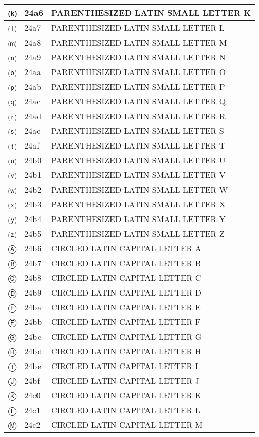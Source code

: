 \documentclass[12pt,letterpaper,openany]{book}
\begin{document}
\begin{center}
\begin{supertabular}{|m{0.25in}|m{0.5in}|m{4in}|}
⒦ & 24a6 & PARENTHESIZED LATIN SMALL LETTER K\\\hline
⒧ & 24a7 & PARENTHESIZED LATIN SMALL LETTER L\\\hline
⒨ & 24a8 & PARENTHESIZED LATIN SMALL LETTER M\\\hline
⒩ & 24a9 & PARENTHESIZED LATIN SMALL LETTER N\\\hline
⒪ & 24aa & PARENTHESIZED LATIN SMALL LETTER O\\\hline
⒫ & 24ab & PARENTHESIZED LATIN SMALL LETTER P\\\hline
⒬ & 24ac & PARENTHESIZED LATIN SMALL LETTER Q\\\hline
⒭ & 24ad & PARENTHESIZED LATIN SMALL LETTER R\\\hline
⒮ & 24ae & PARENTHESIZED LATIN SMALL LETTER S\\\hline
⒯ & 24af & PARENTHESIZED LATIN SMALL LETTER T\\\hline
⒰ & 24b0 & PARENTHESIZED LATIN SMALL LETTER U\\\hline
⒱ & 24b1 & PARENTHESIZED LATIN SMALL LETTER V\\\hline
⒲ & 24b2 & PARENTHESIZED LATIN SMALL LETTER W\\\hline
⒳ & 24b3 & PARENTHESIZED LATIN SMALL LETTER X\\\hline
⒴ & 24b4 & PARENTHESIZED LATIN SMALL LETTER Y\\\hline
⒵ & 24b5 & PARENTHESIZED LATIN SMALL LETTER Z\\\hline
Ⓐ & 24b6 & CIRCLED LATIN CAPITAL LETTER A\\\hline
Ⓑ & 24b7 & CIRCLED LATIN CAPITAL LETTER B\\\hline
Ⓒ & 24b8 & CIRCLED LATIN CAPITAL LETTER C\\\hline
Ⓓ & 24b9 & CIRCLED LATIN CAPITAL LETTER D\\\hline
Ⓔ & 24ba & CIRCLED LATIN CAPITAL LETTER E\\\hline
Ⓕ & 24bb & CIRCLED LATIN CAPITAL LETTER F\\\hline
Ⓖ & 24bc & CIRCLED LATIN CAPITAL LETTER G\\\hline
Ⓗ & 24bd & CIRCLED LATIN CAPITAL LETTER H\\\hline
Ⓘ & 24be & CIRCLED LATIN CAPITAL LETTER I\\\hline
Ⓙ & 24bf & CIRCLED LATIN CAPITAL LETTER J\\\hline
Ⓚ & 24c0 & CIRCLED LATIN CAPITAL LETTER K\\\hline
Ⓛ & 24c1 & CIRCLED LATIN CAPITAL LETTER L\\\hline
Ⓜ & 24c2 & CIRCLED LATIN CAPITAL LETTER M\\\hline

\end{supertabular}
\end{center}
\end{document}
